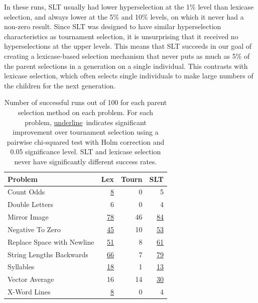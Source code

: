 \documentclass{sig-alternate}
\begin{document}


In these runs, SLT usually had lower hyperselection at the 1\% level than lexicase selection, and always lower at the 5\% and 10\% levels, on which it never had a non-zero result. Since SLT was designed to have similar hyperselection characteristics as tournament selection, it is unsurprising that it received no hyperselections at the upper levels. This means that SLT succeeds in our goal of creating a lexicase-based selection mechanism that never puts as much as 5\% of the parent selections in a generation on a single individual. This contrasts with lexicase selection, which often selects single individuals to make large numbers of the children for the next generation.

\begin{table}[t]
\centering
\caption{Number of successful runs out of 100 for each parent selection method on each problem. For each problem, \underline{underline}~indicates significant improvement over tournament selection using a pairwise chi-squared test with Holm correction and 0.05 significance level. SLT and lexicase selection never have significantly different success rates.}
\label{table:slt-results}
\begin{tabular}{lrrr}
\toprule
\textbf{Problem}                    & \textbf{Lex} & \textbf{Tourn} & \textbf{SLT} \\
\midrule
Count Odds                 & \underline{8}        & 0          & 5   \\
Double Letters             & 6        & 0          & 4   \\
Mirror Image               & \underline{78}       & 46         & \underline{84}  \\
Negative To Zero           & \underline{45}       & 10         & \underline{53}  \\
Replace Space with Newline & \underline{51}       & 8          & \underline{61}  \\
String Lengths Backwards   & \underline{66}       & 7          & \underline{79}  \\
Syllables                  & \underline{18}       & 1          & \underline{13}  \\
Vector Average             & 16       & 14         & \underline{30}  \\
X-Word Lines               & \underline{8}        & 0          & 4   \\
\bottomrule
\end{tabular}
\end{table}
\end{document}
